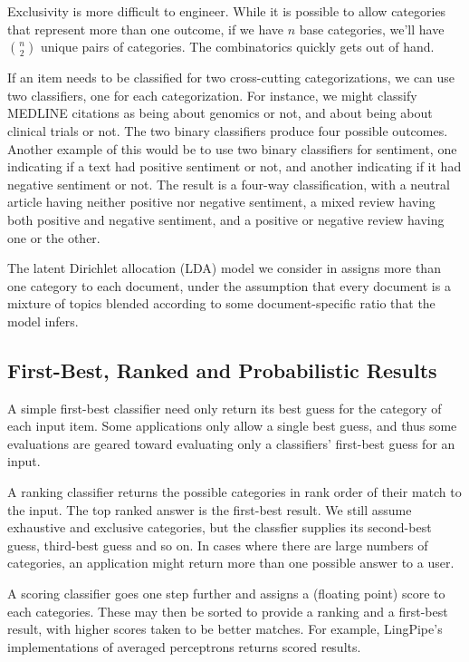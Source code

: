 Exclusivity is more difficult to engineer.  While it is possible to
allow categories that represent more than one outcome, if we have $n$
base categories, we'll have ${n \choose 2}$ unique pairs of
categories.  The combinatorics quickly gets out of hand.

If an item needs to be classified for two cross-cutting
categorizations, we can use two classifiers, one for each
categorization.  For instance, we might classify MEDLINE citations as
being about genomics or not, and about being about clinical trials or
not.  The two binary classifiers produce four possible outcomes.
Another example of this would be to use two binary classifiers for
sentiment, one indicating if a text had positive sentiment or not, and
another indicating if it had negative sentiment or not.  The result is
a four-way classification, with a neutral article having neither
positive nor negative sentiment, a mixed review having both positive
and negative sentiment, and a positive or negative review having one
or the other.

The latent Dirichlet allocation (LDA) model we consider in
 assigns more than one category to each document, under
the assumption that every document is a mixture of topics blended
according to some document-specific ratio that the model infers.

\subsection{First-Best, Ranked and Probabilistic Results}

A simple first-best classifier need only return its best guess for the
category of each input item.  Some applications only allow a single
best guess, and thus some evaluations are geared toward evaluating
only a classifiers' first-best guess for an input.

A ranking classifier returns the possible categories in rank order of
their match to the input.  The top ranked answer is the first-best
result.  We still assume exhaustive and exclusive categories, but the
classfier supplies its second-best guess, third-best guess and so on.
In cases where there are large numbers of categories, an application
might return more than one possible answer to a user.

A scoring classifier goes one step further and assigns a (floating
point) score to each categories.  These may then be sorted to provide
a ranking and a first-best result, with higher scores taken to be
better matches.  For example, LingPipe's implementations of averaged
perceptrons returns scored results.

